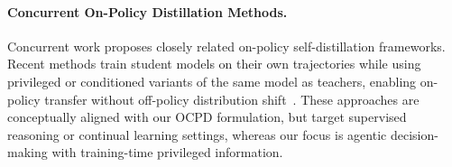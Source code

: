 

\paragraph{Concurrent On-Policy Distillation Methods.}
Concurrent work proposes closely related on-policy self-distillation frameworks. Recent methods train student models on their own trajectories while using privileged or conditioned variants of the same model as teachers, enabling on-policy transfer without off-policy distribution shift~\citep{zhao2026selfdistilledreasoneronpolicyselfdistillation,shenfeld2026selfdistillationenablescontinuallearning}. These approaches are conceptually aligned with our OCPD formulation, but target supervised reasoning or continual learning settings, whereas our focus is agentic decision-making with training-time privileged information.





